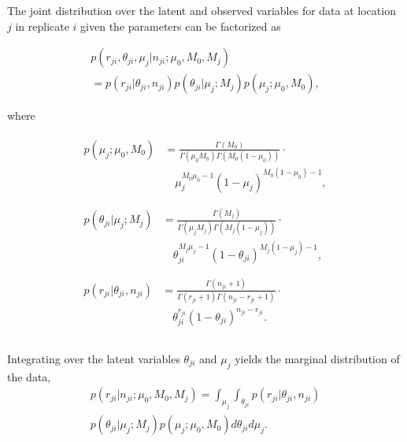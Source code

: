 \documentclass{bioinfo}
\begin{document}
The joint distribution over the latent and observed variables for data at location $j$ in replicate $i$ given the parameters can be factorized as

\begin{multline}\label{eqn:jointpdf}
p \left( r_{ji}, \theta_{ji}, \mu_j | n_{ji}; \mu_0, M_0, M_j \right) \\ = p \left( r_{ji} | \theta_{ji}, n_{ji} \right) p\left( \theta_{ji} | \mu_j; M_j \right) p\left( \mu_j; \mu_0, M_0 \right),
\end{multline}


where

\begin{align}
  \begin{split}
  p\left( \mu_j; \mu_0, M_0 \right)  &= \frac{ \Gamma(M_0) } { \Gamma(\mu_0 M_0) \Gamma(M_0 (1-\mu_0)) } \cdot \\
  &\quad \mu_j^{M_0\mu_0 -1} (1 - \mu_j)^{M_0 ( 1 - \mu_0) - 1}, \nonumber \\
  \end{split}\\
  \begin{split}
  p\left( \theta_{ji} | \mu_j; M_j \right) &= \frac{ \Gamma(M_j) } { \Gamma(\mu_j M_j) \Gamma(M_j (1-\mu_j)) } \cdot \\
  &\quad \theta_{ji}^{M_j\mu_j -1} (1 - \theta_{ji})^{M_j ( 1 - \mu_j) - 1}, \nonumber \\
  \end{split}\\
  \begin{split}
  p\left( r_{ji} | \theta_{ji}, n_{ji} \right) &= \frac{ \Gamma(n_{ji}+1) } { \Gamma(r_{ji}+1) \Gamma( n_{ji} - r_{ji} + 1 ) } \cdot \\
  &\quad \theta_{ji}^{r_{ji}} (1 - \theta_{ji})^{n_{ji} - r_{ji}}. \nonumber\\
  \end{split}\\
\end{align}


Integrating over the latent variables $\theta_{ji}$ and $\mu_j$ yields the marginal distribution of the data,
\begin{multline}
p \left( r_{ji} | n_{ji} ; \mu_0, M_0, M_j \right) = \int_{\mu_j} \int_{\theta_{ji}}  p \left( r_{ji} | \theta_{ji}, n_{ji} \right) \\ p\left( \theta_{ji} | \mu_j; M_j \right) p\left( \mu_j; \mu_0, M_0 \right) d\theta_{ji} d\mu_j.
\end{multline}
\end{document}

